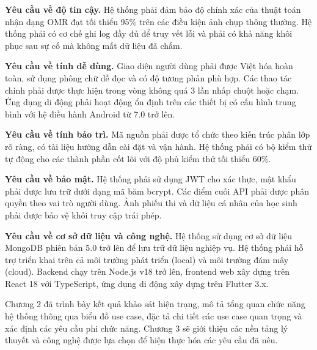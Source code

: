 ﻿\documentclass[../DoAn.tex]{subfiles}
\begin{document}
\noindent\textbf{Yêu cầu về độ tin cậy.} Hệ thống phải đảm bảo độ chính xác của thuật toán nhận dạng OMR đạt tối thiểu 95\% trên các điều kiện ảnh chụp thông thường. Hệ thống phải có cơ chế ghi log đầy đủ để truy vết lỗi và phải có khả năng khôi phục sau sự cố mà không mất dữ liệu đã chấm.

\noindent\textbf{Yêu cầu về tính dễ dùng.} Giao diện người dùng phải được Việt hóa hoàn toàn, sử dụng phông chữ dễ đọc và có độ tương phản phù hợp. Các thao tác chính phải được thực hiện trong vòng không quá 3 lần nhấp chuột hoặc chạm. Ứng dụng di động phải hoạt động ổn định trên các thiết bị có cấu hình trung bình với hệ điều hành Android từ 7.0 trở lên.

\noindent\textbf{Yêu cầu về tính bảo trì.} Mã nguồn phải được tổ chức theo kiến trúc phân lớp rõ ràng, có tài liệu hướng dẫn cài đặt và vận hành. Hệ thống phải có bộ kiểm thử tự động cho các thành phần cốt lõi với độ phủ kiểm thử tối thiểu 60\%.

\noindent\textbf{Yêu cầu về bảo mật.} Hệ thống phải sử dụng JWT cho xác thực, mật khẩu phải được lưu trữ dưới dạng mã băm bcrypt. Các điểm cuối API phải được phân quyền theo vai trò người dùng. Ảnh phiếu thi và dữ liệu cá nhân của học sinh phải được bảo vệ khỏi truy cập trái phép.

\noindent\textbf{Yêu cầu về cơ sở dữ liệu và công nghệ.} Hệ thống sử dụng cơ sở dữ liệu MongoDB phiên bản 5.0 trở lên để lưu trữ dữ liệu nghiệp vụ. Hệ thống phải hỗ trợ triển khai trên cả môi trường phát triển (local) và môi trường đám mây (cloud). Backend chạy trên Node.js v18 trở lên, frontend web xây dựng trên React 18 với TypeScript, ứng dụng di động xây dựng trên Flutter 3.x.

Chương 2 đã trình bày kết quả khảo sát hiện trạng, mô tả tổng quan chức năng hệ thống thông qua biểu đồ use case, đặc tả chi tiết các use case quan trọng và xác định các yêu cầu phi chức năng. Chương 3 sẽ giới thiệu các nền tảng lý thuyết và công nghệ được lựa chọn để hiện thực hóa các yêu cầu đã nêu.
\end{document}
